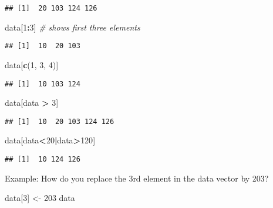 \documentclass[]{book}
\newenvironment{Shaded}{\begin{snugshade}}{\end{snugshade}}
\newcommand{\CommentTok}[1]{\textcolor[rgb]{0.56,0.35,0.01}{\textit{#1}}}
\newcommand{\DecValTok}[1]{\textcolor[rgb]{0.00,0.00,0.81}{#1}}
\newcommand{\KeywordTok}[1]{\textcolor[rgb]{0.13,0.29,0.53}{\textbf{#1}}}
\newcommand{\NormalTok}[1]{#1}
\newcommand{\OperatorTok}[1]{\textcolor[rgb]{0.81,0.36,0.00}{\textbf{#1}}}
\newcommand{\StringTok}[1]{\textcolor[rgb]{0.31,0.60,0.02}{#1}}
\begin{document}
\begin{verbatim}
## [1]  20 103 124 126
\end{verbatim}

\begin{Shaded}
\begin{Highlighting}[]
\NormalTok{data[}\DecValTok{1}\OperatorTok{:}\DecValTok{3}\NormalTok{] }\CommentTok{# shows first three elements}
\end{Highlighting}
\end{Shaded}

\begin{verbatim}
## [1]  10  20 103
\end{verbatim}

\begin{Shaded}
\begin{Highlighting}[]
\NormalTok{data[}\KeywordTok{c}\NormalTok{(}\DecValTok{1}\NormalTok{, }\DecValTok{3}\NormalTok{, }\DecValTok{4}\NormalTok{)]}
\end{Highlighting}
\end{Shaded}

\begin{verbatim}
## [1]  10 103 124
\end{verbatim}

\begin{Shaded}
\begin{Highlighting}[]
\NormalTok{data[data }\OperatorTok{>}\StringTok{ }\DecValTok{3}\NormalTok{]}
\end{Highlighting}
\end{Shaded}

\begin{verbatim}
## [1]  10  20 103 124 126
\end{verbatim}

\begin{Shaded}
\begin{Highlighting}[]
\NormalTok{data[data}\OperatorTok{<}\DecValTok{20}\OperatorTok{|}\NormalTok{data}\OperatorTok{>}\DecValTok{120}\NormalTok{]}
\end{Highlighting}
\end{Shaded}

\begin{verbatim}
## [1]  10 124 126
\end{verbatim}

Example: How do you replace the 3rd element in the data vector by 203?

\begin{Shaded}
\begin{Highlighting}[]
\NormalTok{data[}\DecValTok{3}\NormalTok{] <-}\StringTok{ }\DecValTok{203}
\NormalTok{data}
\end{Highlighting}
\end{Shaded}
\end{document}
